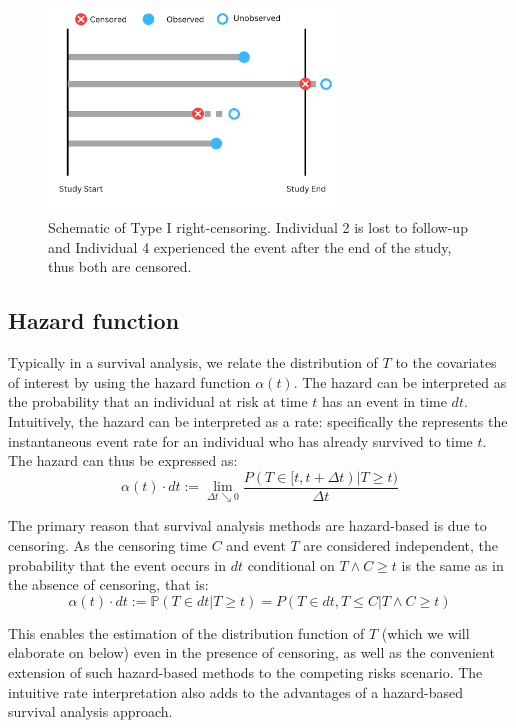 \begin{figure}[h]
    \centering
    \includegraphics[width=3in]{censoring.png}
    \caption{Schematic of Type I right-censoring. Individual 2 is lost to follow-up and Individual 4 experienced the event after the end of the study, thus both are censored.}
    \label{fig:fig2}   %
    \end{figure}

\subsection{Hazard function}

Typically in a survival analysis, we relate the distribution of $T$ to the covariates of interest by using the hazard function $\alpha(t)$. The hazard can be interpreted as the probability that an individual at risk at time $t$ has an event in time $dt$. Intuitively, the hazard can be interpreted as a rate: specifically the represents the instantaneous event rate for an individual who has already survived to time $t$. The hazard can thus be expressed as: 
\begin{equation}
\alpha(t) \cdot dt := \lim_{\Delta t \searrow 0} \frac{P(T \in [t, t + \Delta t)| T \geq t)}{\Delta t}
\end{equation}

The primary reason that survival analysis methods are hazard-based is due to censoring. As the censoring time $C$ and event $T$ are considered independent, the probability that the event occurs in $dt$ conditional on $T \wedge C \geq t$ is the same as in the absence of censoring, that is:
\begin{equation}
\alpha(t) \cdot dt := \mathbb{P}(T \in dt| T \geq t) = P(T \in dt, T \leq C|T \wedge C \geq t)
\end{equation}

This enables the estimation of the distribution function of $T$ (which we will elaborate on below) even in the presence of censoring, as well as the convenient extension of such hazard-based methods to the competing risks scenario. The intuitive rate interpretation also adds to the advantages of a hazard-based survival analysis approach.

